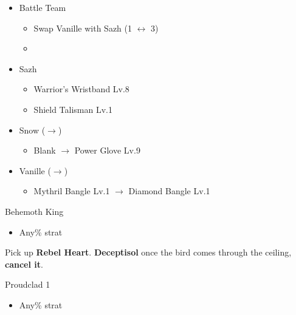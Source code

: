 \begin{menu}
\begin{itemize}
\begin{itemize}
		\end{itemize}
		\paradigm
		\begin{itemize}
			\item Battle Team
				\begin{itemize}
					\item Swap Vanille with Sazh (1 $\leftrightarrow$ 3)
					\item {}%
				  {\paradigmline{\com}{(\com)}{\med}}%
			      {\paradigmline[4]{\com}{(\com)}{(\com)}}%
			      {\paradigmline{\syn}{\sen}{(\sab)}}%
			      {\paradigmline{[\syn]}{(\rav)}{(\med)}}%
			      {\paradigmline{\rav}{(\rav)}{[\med]}}%
			      {\paradigmline{\rav}{[\rav]}{\rav}}%
				\end{itemize}
		\end{itemize}
		\equip
		\begin{itemize}
			\item Sazh
				\begin{itemize}
					\item Warrior's Wristband Lv.8
					\item Shield Talisman Lv.1
				\end{itemize}
			\item Snow ($\rightarrow$)
				\begin{itemize}
					\item Blank $\rightarrow$ Power Glove Lv.9
				\end{itemize}
			\item Vanille ($\rightarrow$)
				\begin{itemize}
					\item Mythril Bangle Lv.1 $\rightarrow$ Diamond Bangle Lv.1
				\end{itemize}
		\end{itemize}
	\end{itemize}
\end{menu}

\begin{battle}{Behemoth King}
	\begin{itemize}
		\item Any\% strat
	\end{itemize}
\end{battle}

Pick up \textbf{Rebel Heart}.
\textbf{Deceptisol} once the bird comes through the ceiling, \textbf{cancel it}.

\begin{battle}{Proudclad 1}
	\begin{itemize}
		\item Any\% strat
	\end{itemize}
\end{battle}

